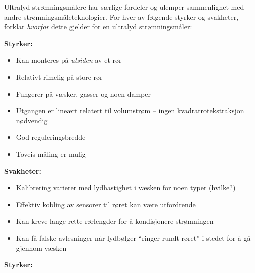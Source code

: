 

Ultralyd strømningsmålere har særlige fordeler og ulemper sammenlignet med andre strømningsmåleteknologier. For hver av følgende styrker og svakheter, forklar \textit{hvorfor} dette gjelder for en ultralyd strømningsmåler:

\vskip 10pt

{\bf Styrker:}

\begin{itemize}
\item{} Kan monteres på \textit{utsiden} av et rør
\item{} Relativt rimelig på store rør
\item{} Fungerer på væsker, gasser og noen damper
\item{} Utgangen er lineært relatert til volumstrøm -- ingen kvadratrotekstraksjon nødvendig
\item{} God reguleringsbredde
\item{} Toveis måling er mulig
\end{itemize}

\vskip 10pt

{\bf Svakheter:}

\begin{itemize}
\item{} Kalibrering varierer med lydhastighet i væsken for noen typer (hvilke?)
\item{} Effektiv kobling av sensorer til røret kan være utfordrende
\item{} Kan kreve lange rette rørlengder for å kondisjonere strømningen
\item{} Kan få falske avlesninger når lydbølger ``ringer rundt røret'' i stedet for å gå gjennom væsken
\end{itemize}














{\bf Styrker:}

